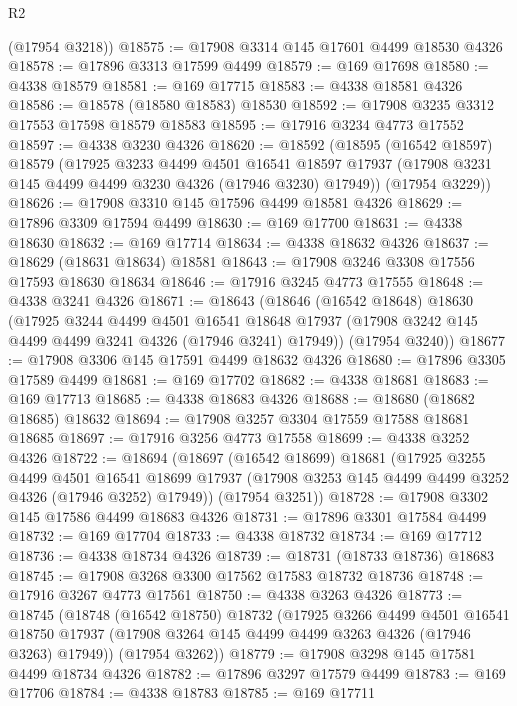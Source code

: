 \begin{lexlean}{R2}
\begin{coremodule}
      (@17954 @3218))
@18575 := @17908 @3314 @145 @17601 @4499 @18530 @4326
@18578 := @17896 @3313 @17599 @4499
@18579 := @169 @17698
@18580 := @4338 @18579
@18581 := @169 @17715
@18583 := @4338 @18581 @4326
@18586 := @18578 (@18580 @18583) @18530
@18592 := @17908 @3235 @3312 @17553 @17598 @18579 @18583
@18595 := @17916 @3234 @4773 @17552
@18597 := @4338 @3230 @4326
@18620 := @18592
    (@18595
      (@16542 @18597)
      @18579
      (@17925
        @3233
        @4499
        @4501
        @16541
        @18597
        @17937
        (@17908 @3231 @145 @4499 @4499 @3230 @4326 (@17946 @3230) @17949))
      (@17954 @3229))
@18626 := @17908 @3310 @145 @17596 @4499 @18581 @4326
@18629 := @17896 @3309 @17594 @4499
@18630 := @169 @17700
@18631 := @4338 @18630
@18632 := @169 @17714
@18634 := @4338 @18632 @4326
@18637 := @18629 (@18631 @18634) @18581
@18643 := @17908 @3246 @3308 @17556 @17593 @18630 @18634
@18646 := @17916 @3245 @4773 @17555
@18648 := @4338 @3241 @4326
@18671 := @18643
    (@18646
      (@16542 @18648)
      @18630
      (@17925
        @3244
        @4499
        @4501
        @16541
        @18648
        @17937
        (@17908 @3242 @145 @4499 @4499 @3241 @4326 (@17946 @3241) @17949))
      (@17954 @3240))
@18677 := @17908 @3306 @145 @17591 @4499 @18632 @4326
@18680 := @17896 @3305 @17589 @4499
@18681 := @169 @17702
@18682 := @4338 @18681
@18683 := @169 @17713
@18685 := @4338 @18683 @4326
@18688 := @18680 (@18682 @18685) @18632
@18694 := @17908 @3257 @3304 @17559 @17588 @18681 @18685
@18697 := @17916 @3256 @4773 @17558
@18699 := @4338 @3252 @4326
@18722 := @18694
    (@18697
      (@16542 @18699)
      @18681
      (@17925
        @3255
        @4499
        @4501
        @16541
        @18699
        @17937
        (@17908 @3253 @145 @4499 @4499 @3252 @4326 (@17946 @3252) @17949))
      (@17954 @3251))
@18728 := @17908 @3302 @145 @17586 @4499 @18683 @4326
@18731 := @17896 @3301 @17584 @4499
@18732 := @169 @17704
@18733 := @4338 @18732
@18734 := @169 @17712
@18736 := @4338 @18734 @4326
@18739 := @18731 (@18733 @18736) @18683
@18745 := @17908 @3268 @3300 @17562 @17583 @18732 @18736
@18748 := @17916 @3267 @4773 @17561
@18750 := @4338 @3263 @4326
@18773 := @18745
    (@18748
      (@16542 @18750)
      @18732
      (@17925
        @3266
        @4499
        @4501
        @16541
        @18750
        @17937
        (@17908 @3264 @145 @4499 @4499 @3263 @4326 (@17946 @3263) @17949))
      (@17954 @3262))
@18779 := @17908 @3298 @145 @17581 @4499 @18734 @4326
@18782 := @17896 @3297 @17579 @4499
@18783 := @169 @17706
@18784 := @4338 @18783
@18785 := @169 @17711

\end{coremodule}
\end{lexlean}
